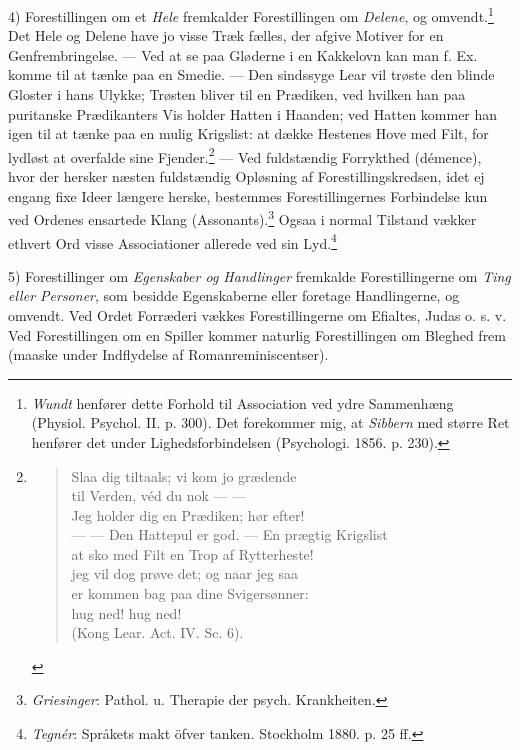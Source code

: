 \documentclass[12pt,a4paper,openany]{book}
\newcommand{\opage}[1]{\marginnote{\footnotesize\textit{[#1]}}}
\begin{document}
4) Forestillingen om et \emph{Hele} fremkalder Forestillingen om
\emph{Delene}, og omvendt.\footnote[1]{\emph{Wundt} henfører dette
Forhold til Association ved ydre Sammenhæng (Physiol. Psychol. II. p.
300). Det forekommer mig, at \emph{Sibbern} med større Ret henfører det
under Lighedsforbindelsen (Psychologi. 1856. p. 230).} Det Hele og
Delene have jo visse Træk fælles, der afgive Motiver for en
Genfrembringelse. --- Ved at se paa Gløderne i en Kakkelovn kan man f.
Ex. komme til at tænke paa en Smedie. --- Den sindssyge Lear vil trøste
den blinde Gloster i hans Ulykke; Trøsten bliver til en Prædiken, ved
hvilken han paa puritanske Prædikanters Vis holder Hatten i Haanden; ved
Hatten kommer han igen til at tænke paa en mulig Krigslist: at dække
Hestenes Hove med Filt, for lydløst at overfalde sine
Fjender.\footnote[2]{\begin{verse}
Slaa dig tiltaals; vi kom jo grædende\\
til Verden, véd du nok --- ---\\
Jeg holder dig en Prædiken; hør efter!\\
--- --- Den Hattepul er god. --- En prægtig Krigslist\\
at sko med Filt en Trop af Rytterheste!\\
jeg vil dog prøve det; og naar jeg saa\\
er kommen bag paa dine Svigersønner:\\
hug ned! hug ned!\\
\hspace*{\fill}(Kong Lear. Act. IV. Sc. 6).
\end{verse}} --- Ved fuldstændig Forrykthed
(démence), hvor der hersker næsten fuldstændig Opløsning af
Forestillingskredsen, idet ej engang fixe Ideer længere herske,
bestemmes Forestillingernes Forbindelse kun ved Ordenes ensartede Klang
(Assonants).\footnote[3]{\emph{Griesinger}: Pathol. u. Therapie der
psych. Krankheiten.} Ogsaa i normal Tilstand vækker ethvert Ord visse
Associationer allerede ved sin Lyd.\footnote[4]{\emph{Tegnér}: Språkets
makt öfver tanken. Stockholm 1880. p. 25 ff.}

5) Forestillinger om \emph{Egenskaber og Handlinger} fremkalde
Forestillingerne om \emph{Ting eller Personer}, som besidde Egenskaberne
eller foretage Handlingerne, og omvendt. Ved Ordet Forræderi vækkes
Forestillingerne om Efialtes, Judas o. s. v. Ved Forestillingen om en
Spiller kommer naturlig
\opage{190}Forestillingen om Bleghed frem (maaske under Indflydelse af
Romanreminiscentser).
\end{document}
